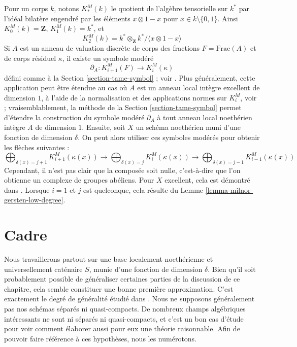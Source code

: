 \begin{remark}
\label{remark-gersten-complex-milnor}
Pour un corps $k$, notons $K^M_*(k)$ le quotient de
l'algèbre tensorielle sur $k^*$ par l'idéal bilatère
engendré par les éléments $x \otimes 1 - x$ pour $x \in k \setminus \{0, 1\}$.
Ainsi $K^M_0(k) = \mathbf{Z}$, $K_1^M(k) = k^*$, et
$$
K^M_2(k) = k^* \otimes_\mathbf{Z} k^* / \langle x \otimes 1 - x \rangle
$$
Si $A$ est un anneau de valuation discrète de corps des fractions $F = \text{Frac}(A)$
et de corps résiduel $\kappa$, il existe un symbole modéré
$$
\partial_A : K_{i + 1}^M(F) \to K_i^M(\kappa)
$$
défini comme à la Section \ref{section-tame-symbol} ; voir \cite{Kato-Milnor-K}.
Plus généralement, cette application peut être étendue au cas où $A$ est un
anneau local intègre excellent de dimension $1$, à l'aide de la normalisation et des applications
normes sur $K_i^M$, voir \cite{Kato-Milnor-K} ; vraisemblablement, la méthode de la
Section \ref{section-tame-symbol} permet d'étendre la construction
du symbole modéré $\partial_A$ à tout anneau local noethérien intègre $A$
de dimension $1$. Ensuite, soit $X$ un schéma noethérien muni d'une
fonction de dimension $\delta$. On peut alors utiliser ces symboles modérés pour obtenir
les flèches suivantes :
$$
\bigoplus\nolimits_{\delta(x) = j + 1} K^M_{i + 1}(\kappa(x))
\longrightarrow
\bigoplus\nolimits_{\delta(x) = j} K^M_i(\kappa(x))
\longrightarrow
\bigoplus\nolimits_{\delta(x) = j - 1} K^M_{i - 1}(\kappa(x))
$$
Cependant, il n'est pas clair que la composée soit nulle, c'est-à-dire que
l'on obtienne un complexe de groupes abéliens.
Pour $X$ excellent, cela est démontré dans \cite{Kato-Milnor-K}.
Lorsque $i = 1$ et $j$ est quelconque, cela résulte du
Lemme \ref{lemma-milnor-gersten-low-degree}.
\end{remark}





















\section{Cadre}
\label{section-setup}

\noindent
Nous travaillerons partout sur une base localement noethérienne et universellement
caténaire $S$, munie d'une fonction de dimension $\delta$.
Bien qu'il soit probablement possible de généraliser certaines parties de la
discussion de ce chapitre, cela semble constituer une bonne première
approximation. C'est exactement le degré de généralité étudié dans \cite{Thorup}.
Nous ne supposons généralement pas nos schémas
séparés ni quasi-compacts. De nombreux champs algébriques intéressants
ne sont ni séparés ni quasi-compacts, et c'est un bon
cas d'étude pour voir comment élaborer aussi pour eux une théorie raisonnable.
Afin de pouvoir faire référence à ces hypothèses, nous les numérotons.

